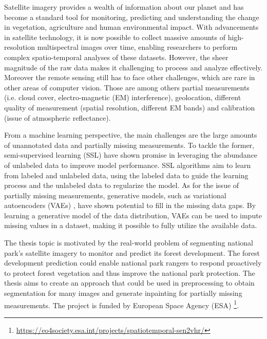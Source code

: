 

Satellite imagery provides a wealth of information about our planet and has become a standard tool for monitoring, predicting and understanding 
the change in vegetation, agriculture and human environmental impact. With advancements in satellite technology, it is now possible to collect
massive amounts of high-resolution multispectral images over time, enabling researchers to perform complex spatio-temporal analyses of these 
datasets. However, the sheer magnitude of the raw data makes it challenging to process and analyze effectively. Moreover the remote sensing 
still has to face other challenges, which are rare in other areas of computer vision. Those are among others partial measurements 
(i.e. cloud cover, electro-magnetic (EM) interference), geolocation, different quality of measurement (spatial resolution, different EM bands) and 
calibration (issue of atmospheric reflectance).

From a machine learning perspective, the main challenges are the large amounts of unannotated data and partially missing measurements.
To tackle the former, semi-supervised learning \cite{ssl-book-2006} (SSL) have shown promise in leveraging the abundance of unlabeled
data to improve model performance. SSL algorithms aim to learn from labeled and unlabeled data, using the labeled data to guide the 
learning process and the unlabeled data to regularize the model. As for the issue of partially missing measurements, generative
models, such as variational autoencoders (VAEs) \cite{intro-vae-2019}, have shown potential to fill in the missing data gaps. 
By learning a generative model of the data distribution, VAEs can be used to impute missing values in a dataset, making it possible to 
fully utilize the available data.

The thesis topic is motivated by the real-world problem of segmenting national park's satellite imagery to monitor and predict 
its forest development. The forest development prediction could enable national park rangers to respond proactively to protect forest vegetation and thus
improve the national park protection. The thesis aims to create an approach that could be used in preprocessing to obtain segmentation for many images and 
generate inpainting for partially missing measurements. The project is funded by European Space Agency (ESA)
\footnote[1]{\url{https://eo4society.esa.int/projects/spatiotemporal-sen2vhr/}}.

